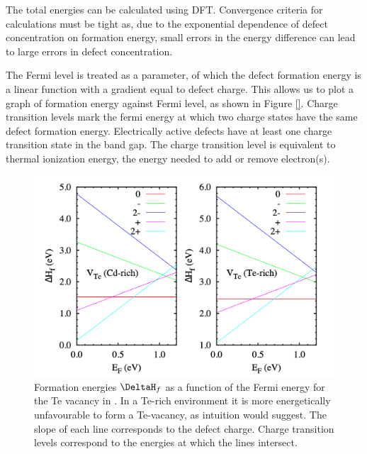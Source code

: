 The total energies can be calculated using DFT. Convergence criteria for calculations must be tight as, due to the exponential dependence of defect concentration on formation energy, small errors in the energy difference can lead to large errors in defect concentration.

The Fermi level is treated as a parameter, of which the defect formation energy is a linear function with a gradient equal to defect charge. This allows us to plot a graph of formation energy against Fermi level, as shown in Figure \ref{}. Charge transition levels mark the fermi energy at which two charge states have the same defect formation energy. Electrically active defects have at least one charge transition state in the band gap. 
The charge transition level is equivalent to thermal ionization energy, the energy needed to add or remove electron(s). %

\begin{figure}[h]
\centering
  \includegraphics[resolution=450]{figures/ch3/defectenergetics.png}
  \caption[Formation energies for the Te vacancy in CdTe]{Formation energies $\DeltaH_f$ as a function of the Fermi energy for the Te vacancy in . In a Te-rich environment it is more energetically unfavourable to form a Te-vacancy, as intuition would suggest. The slope of each line corresponds to the defect charge. Charge transition levels correspond to the energies at which the lines intersect.}
\end{figure}%

